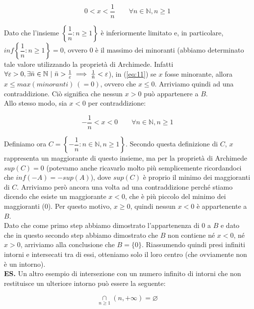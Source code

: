 \documentclass{article}
\begin{document}
\begin{equation}
    0 < x < \frac{1}{n} \qquad \forall n \in \mathbb{N}, n \geq 1
    \label{eq:11}
\end{equation}

\noindent Dato che l'insieme $\left\{\dfrac{1}{n} : n \geq 1\right\}$ è inferiormente limitato e, in particolare, $inf\left\{\dfrac{1}{n} : n \geq 1\right\} = 0$, ovvero $0$ è il massimo dei minoranti (abbiamo determinato tale valore utilizzando la proprietà di Archimede. Infatti $\forall \varepsilon > 0, \exists \Bar{n} \in \mathbb{N} \ | \ \Bar{n} > \frac{1}{\varepsilon} \implies \frac{1}{\Bar{n}} < \varepsilon$), in (\ref{eq:11}) se $x$ fosse minorante, allora $x \leq max(minoranti) \ (= 0)$, ovvero che $x \leq 0$. Arriviamo quindi ad una contraddizione. Ciò significa che nessun $x > 0$ può appartenere a $B$. \\
Allo stesso modo, sia $x < 0$ per contraddizione:

\begin{equation*}
    -\frac{1}{n} < x < 0 \qquad \forall n \in \mathbb{N}, n \geq 1
\end{equation*}

\noindent Definiamo ora $C = \left\{-\dfrac{1}{n} : n \in \mathbb{N}, n \geq 1\right\}$. Secondo questa definizione di $C$, $x$ rappresenta un maggiorante di questo insieme, ma per la proprietà di Archimede $sup(C) = 0$ (potevamo anche ricavarlo molto più semplicemente ricordandoci che $inf(-A) = -sup(A)$), dove $sup(C)$ è proprio il minimo dei maggioranti di $C$. Arriviamo però ancora una volta ad una contraddizione perché stiamo dicendo che esiste un maggiorante $x < 0$, che è più piccolo del minimo dei maggioranti ($0$). Per questo motivo, $x \geq 0$, quindi nessun $x < 0$ è appartenente a $B$.\\
Dato che come primo step abbiamo dimostrato l'appartenenza di $0$ a $B$ e dato che in questo secondo step abbiamo dimostrato che $B$ non contiene né $x < 0$, né $x > 0$, arriviamo alla conclusione che $B = \{0\}$. Riassumendo quindi presi infiniti intorni e intersecati tra di essi, otteniamo solo il loro centro (che ovviamente non è un intorno).\\

\noindent\textbf{ES.} Un altro esempio di intersezione con un numero infinito di intorni che non restituisce un ulteriore intorno può essere la seguente: 

\begin{equation*}
    \underset{n \geq 1}{\cap} (n, + \infty) = \varnothing
\end{equation*}
\end{document}
